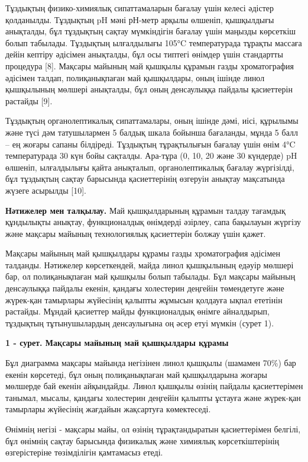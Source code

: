 {Тұздықтың физико-химиялық сипаттамаларын бағалау үшін келесі әдістер
қолданылды. Тұздықтың pH мәні рН-метр арқылы өлшеніп, қышқылдығы
анықталды, бұл тұздықтың сақтау мүмкіндігін бағалау үшін маңызды
көрсеткіш болып табылады. Тұздықтың ылғалдылығы 105°C температурада
тұрақты массаға дейін кептіру әдісімен анықталды, бұл осы типтегі
өнімдер үшін стандартты процедура {[}8{]}. Мақсары майының май қышқылы
құрамын газды хроматография әдісімен талдап, полиқанықпаған май
қышқылдары, оның ішінде линол қышқылының мөлшері анықталды, бұл оның
денсаулыққа пайдалы қасиеттерін растайды {[}9{]}.

Тұздықтың органолептикалық сипаттамалары, оның ішінде дәмі, иісі,
құрылымы және түсі дәм татушылармен 5 балдық шкала бойынша бағаланды,
мұнда 5 балл -- ең жоғары сапаны білдіреді. Тұздықтың тұрақтылығын
бағалау үшін өнім 4°C температурада 30 күн бойы сақталды. Ара-тұра (0,
10, 20 және 30 күндерде) pH өлшеніп, ылғалдылығы қайта анықталып,
органолептикалық бағалау жүргізілді, бұл тұздықтың сақтау барысында
қасиеттерінің өзгеруін анықтау мақсатында жүзеге асырылды {[}10{]}.

{\bfseries Нәтижелер мен талқылау.} Май қышқылдарының құрамын талдау
тағамдық құндылықты анықтау, функционалдық өнімдерді әзірлеу, сапа
бақылауын жүргізу және мақсары майының технологиялық қасиеттерін болжау
үшін қажет.

Мақсары майының май қышқылдары құрамы газды хроматография әдісімен
талданды. Нәтижелер көрсеткендей, майда линол қышқылының едәуір мөлшері
бар, ол полиқанықпаған май қышқылы болып табылады. Бұл мақсары майының
денсаулыққа пайдалы екенін, қандағы холестерин деңгейін төмендетуге және
жүрек-қан тамырлары жүйесінің қалыпты жұмысын қолдауға ықпал ететінін
растайды. Мұндай қасиеттер майды функционалдық өнімге айналдырып,
тұздықтың тұтынушылардың денсаулығына оң әсер етуі мүмкін (сурет 1).

{\bfseries 1 - сурет. Мақсары майының май қышқылдары құрамы}

Бұл диаграмма мақсары майында негізінен линол қышқылы (шамамен 70\%) бар
екенін көрсетеді, бұл оның полиқанықпаған май қышқылдарына жоғары
мөлшерде бай екенін айқындайды. Линол қышқылы өзінің пайдалы
қасиеттерімен танымал, мысалы, қандағы холестерин деңгейін қалыпты
ұстауға және жүрек-қан тамырлары жүйесінің жағдайын жақсартуға
көмектеседі.

Өнімнің негізі - мақсары майы, ол өзінің тұрақтандыратын қасиеттерімен
белгілі, бұл өнімнің сақтау барысында физикалық және химиялық
көрсеткіштерінің өзгерістеріне төзімділігін қамтамасыз етеді.

}
